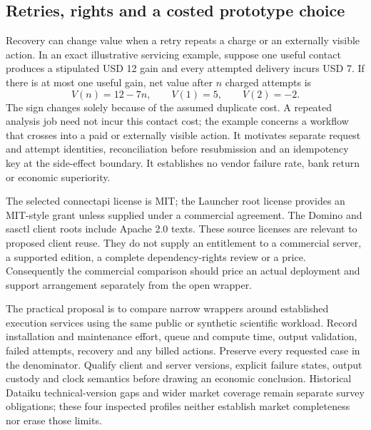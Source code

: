 \subsection{Retries, rights and a costed prototype choice}
\label{exec23:clients-choice}

Recovery can change value when a retry repeats a charge or an externally
visible action. In an exact illustrative servicing example, suppose one
useful contact produces a stipulated USD 12 gain and every attempted
delivery incurs USD 7. If there is at most one useful gain, net value after
$n$ charged attempts is
\begin{equation}
 V(n)=12-7n,\qquad V(1)=5,\qquad V(2)=-2.
 \label{exec23:clients-retry}
\end{equation}
The sign changes solely because of the assumed duplicate cost. A repeated
analysis job need not incur this contact cost; the example concerns a
workflow that crosses into a paid or externally visible action. It motivates
separate request and attempt identities, reconciliation before resubmission
and an idempotency key at the side-effect boundary. It establishes no vendor
failure rate, bank return or economic superiority.
\citep{exec23_workflow_client_reference}

The selected connectapi license is MIT; the Launcher root license provides
an MIT-style grant unless supplied under a commercial agreement. The Domino
and sasctl client roots include Apache 2.0 texts. These source licenses are
relevant to proposed client reuse. They do not supply an entitlement to a
commercial server, a supported edition, a complete dependency-rights review
or a price. Consequently the commercial comparison should price an actual
deployment and support arrangement separately from the open wrapper.
\citep{exec23_workflow_connectapi,exec23_workflow_positgo,
exec23_workflow_dominopy,exec23_workflow_sasctl}

The practical proposal is to compare narrow wrappers around established
execution services using the same public or synthetic scientific workload.
Record installation and maintenance effort, queue and compute time, output
validation, failed attempts, recovery and any billed actions. Preserve every
requested case in the denominator. Qualify client and server versions,
explicit failure states, output custody and clock semantics before drawing
an economic conclusion. Historical Dataiku technical-version gaps and wider
market coverage remain separate survey obligations; these four inspected
profiles neither establish market completeness nor erase those limits.



